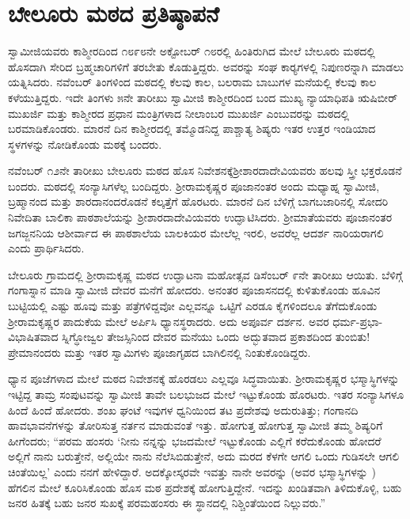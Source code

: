 
\chapter{ಬೇಲೂರು ಮಠದ ಪ್ರತಿಷ್ಠಾಪನೆ}

 ಸ್ವಾಮೀಜಿಯವರು ಕಾಶ್ಮೀರದಿಂದ ೧೮೯೮ನೇ ಅಕ್ಟೋಬರ್ ೧೮ರಲ್ಲಿ ಹಿಂತಿರುಗಿದ ಮೇಲೆ ಬೇಲೂರು ಮಠದಲ್ಲಿ ಹೊಸದಾಗಿ ಸೇರಿದ ಬ್ರಹ್ಮಚಾರಿಗಳಿಗೆ ತರಬೇತು ಕೊಡುತ್ತಿದ್ದರು. ಅವರನ್ನು ಸಂಘ ಕಾರ‍್ಯಗಳಲ್ಲಿ ನಿಪುಣರನ್ನಾಗಿ ಮಾಡಲು ಯತ್ನಿಸಿದರು. ನವೆಂಬರ್ ತಿಂಗಳಿಂದ ಮಠದಲ್ಲಿ ಕೆಲವು ಕಾಲ, ಬಲರಾಮ ಬಾಬುಗಳ ಮನೆಯಲ್ಲಿ ಕೆಲವು ಕಾಲ ಕಳೆಯುತ್ತಿದ್ದರು. ಇದೇ ತಿಂಗಳು ೫ನೇ ತಾರೀಖು ಸ್ವಾಮೀಜಿ ಕಾಶ್ಮೀರದಿಂದ ಬಂದ ಮುಖ್ಯ ನ್ಯಾಯಾಧಿಪತಿ ಋಷಿಬೀರ್ ಮುಖರ್ಜಿ ಮತ್ತು ಕಾಶ್ಮೀರದ ಪ್ರಧಾನ ಮಂತ್ರಿಗಳಾದ ನೀಲಾಂಬರ ಮುಖರ್ಜಿ ಎಂಬುವರನ್ನು ಮಠದಲ್ಲಿ ಬರಮಾಡಿಕೊಂಡರು. ಮಾರನೆ ದಿನ ಕಾಶ್ಮೀರದಲ್ಲಿ ತಮ್ಮೊಡನಿದ್ದ ಪಾಶ್ಚಾತ್ಯ ಶಿಷ್ಯರು ಇತರ ಉತ್ತರ ಇಂಡಿಯಾದ ಸ್ಥಳಗಳನ್ನು ನೋಡಿಕೊಂಡು ಮಠಕ್ಕೆ ಬಂದರು. 

 ನವೆಂಬರ್ ೧೨ನೇ ತಾರೀಖು ಬೇಲೂರು ಮಠದ ಹೊಸ ನಿವೇಶನಕ್ಕೆ\break ಶ‍್ರೀಶಾರದಾದೇವಿಯವರು ಹಲವು ಸ್ತ್ರೀ ಭಕ್ತರೊಡನೆ ಬಂದರು. ಮಠದಲ್ಲಿ ಸಂನ್ಯಾಸಿಗಳೆಲ್ಲ ಬಂದಿದ್ದರು. ಶ‍್ರೀರಾಮಕೃಷ್ಣರ ಪೂಜಾನಂತರ ಅಂದು ಮಧ್ಯಾಹ್ನ ಸ್ವಾಮೀಜಿ, ಬ್ರಹ್ಮಾನಂದ ಮತ್ತು ಶಾರದಾನಂದರೊಡನೆ ಕಲ್ಕತ್ತೆಗೆ ಹೊರಟರು. ಮಾರನೆ ದಿನ ಬೆಳಿಗ್ಗೆ ಬಾಗಬಜಾರಿನಲ್ಲಿ ಸೋದರಿ ನಿವೇದಿತಾ ಬಾಲಿಕಾ ಪಾಠಶಾಲೆಯನ್ನು ಶ‍್ರೀಶಾರದಾದೇವಿಯವರು ಉದ್ಘಾಟಿಸಿದರು. ಶ‍್ರೀಮಾತೆಯವರು ಪೂಜಾನಂತರ ಜಗಜ್ಜನನಿಯ ಆಶೀರ್ವಾದ ಈ ಪಾಠಶಾಲೆಯ ಬಾಲಕಿಯರ ಮೇಲೆಲ್ಲ ಇರಲಿ, ಅವರೆಲ್ಲ ಆದರ್ಶ ನಾರಿಯರಾಗಲಿ ಎಂದು ಪ್ರಾರ್ಥಿಸಿದರು. 

 ಬೇಲೂರು ಗ್ರಾಮದಲ್ಲಿ ಶ‍್ರೀರಾಮಕೃಷ್ಣ ಮಠದ ಉದ್ಘಾಟನಾ ಮಹೋತ್ಸವ ಡಿಸೆಂಬರ್ ೯ನೇ ತಾರೀಖು ಆಯಿತು. ಬೆಳಿಗ್ಗೆ ಗಂಗಾಸ್ನಾನ ಮಾಡಿ ಸ್ವಾಮೀಜಿ ದೇವರ ಮನೆಗೆ ಹೋದರು. ಅನಂತರ ಪೂಜಾಸನದಲ್ಲಿ ಕುಳಿತುಕೊಂಡು ಹೂವಿನ ಬುಟ್ಟಿಯಲ್ಲಿ ಎಷ್ಟು ಹೂವು ಮತ್ತು ಪತ್ರೆಗಳಿದ್ದವೋ ಎಲ್ಲವನ್ನೂ ಒಟ್ಟಿಗೆ ಎರಡೂ ಕೈಗಳಿಂದಲೂ ತೆಗೆದುಕೊಂಡು ಶ‍್ರೀರಾಮಕೃಷ್ಣರ ಪಾದುಕೆಯ ಮೇಲೆ ಅರ್ಪಿಸಿ ಧ್ಯಾನಸ್ಥರಾದರು. ಅದು ಅಪೂರ್ವ ದರ್ಶನ. ಅವರ ಧರ್ಮ-ಪ್ರಭಾ-ವಿಭಾಷಿತವಾದ ಸ್ನಿಗ್ಧೋಜ್ವಲ ತೇಜಸ್ಸಿನಿಂದ ದೇವರ ಮನೆಯು ಒಂದು ಅದ್ಭುತವಾದ ಪ್ರಕಾಶದಿಂದ ತುಂಬಿತು! ಪ್ರೇಮಾನಂದರು ಮತ್ತು ಇತರ ಸ್ವಾಮಿಗಳು ಪೂಜಾಗೃಹದ ಬಾಗಿಲಿನಲ್ಲಿ ನಿಂತುಕೊಂಡಿದ್ದರು. 

 ಧ್ಯಾನ ಪೂಜೆಗಳಾದ ಮೇಲೆ ಮಠದ ನಿವೇಶನಕ್ಕೆ ಹೊರಡಲು ಎಲ್ಲವೂ ಸಿದ್ಧವಾಯಿತು. ಶ‍್ರೀರಾಮಕೃಷ್ಣರ ಭಸ್ಮಾಸ್ಥಿಗಳನ್ನು ಇಟ್ಟಿದ್ದ ತಾಮ್ರ ಸಂಪುಟವನ್ನು ಸ್ವಾಮೀಜಿ ತಾವೇ ಬಲಭುಜದ ಮೇಲೆ ಇಟ್ಟುಕೊಂಡು ಹೊರಟರು. ಇತರ ಸಂನ್ಯಾಸಿಗಳೂ ಹಿಂದೆ ಹಿಂದೆ ಹೋದರು. ಶಂಖ ಘಂಟೆ ಇವುಗಳ ಧ್ವನಿಯಿಂದ ತಟ ಪ್ರದೇಶವು ಅದುರುತಿತ್ತು; ಗಂಗಾನದಿ ಹಾವಭಾವನೆಗಳನ್ನು ತೋರಿಸುತ್ತ ನರ್ತನ ಮಾಡುವಂತೆ ಇತ್ತು. ಹೋಗುತ್ತ ಹೋಗುತ್ತ ಸ್ವಾಮೀಜಿ ತಮ್ಮ ಶಿಷ್ಯರಿಗೆ ಹೀಗೆಂದರು; “ಪರಮ ಹಂಸರು ‘ನೀನು ನನ್ನನ್ನು ಭಜದಮೇಲೆ ಇಟ್ಟುಕೊಂಡು ಎಲ್ಲಿಗೆ ಕರೆದುಕೊಂಡು ಹೋದರೆ ಅಲ್ಲಿಗೆ ನಾನು ಬರುತ್ತೇನೆ, ಅಲ್ಲಿಯೇ ನಾನು ನೆಲೆಸಿಬಿಡುತ್ತೇನೆ, ಅದು ಮರದ ಕೆಳಗೇ ಆಗಲಿ ಒಂದು ಗುಡಿಸಲೇ ಆಗಲಿ ಚಿಂತೆಯಿಲ್ಲ’ ಎಂದು ನನಗೆ ಹೇಳಿದ್ದಾರೆ. ಅದಕ್ಕೋಸ್ಕರವೇ ಇವತ್ತು ನಾನೇ ಅವರನ್ನು (ಅವರ ಭಸ್ಮಾಸ್ಥಿಗಳನ್ನು ) ಹೆಗಲಿನ ಮೇಲೆ ಕೂರಿಸಿಕೊಂಡು ಹೊಸ ಮಠ ಪ್ರದೇಶಕ್ಕೆ ಹೋಗುತ್ತಿದ್ದೇನೆ. ಇದನ್ನು ಖಂಡಿತವಾಗಿ ತಿಳಿದುಕೊಳ್ಳಿ, ಬಹು ಜನರ ಹಿತಕ್ಕೆ ಬಹು ಜನರ ಸುಖಕ್ಕೆ ಪರಮಹಂಸರು ಈ ಸ್ಥಾನದಲ್ಲಿ ನಿಶ್ಚಿಂತೆಯಿಂದ ನಿಲ್ಲುವರು.” 

